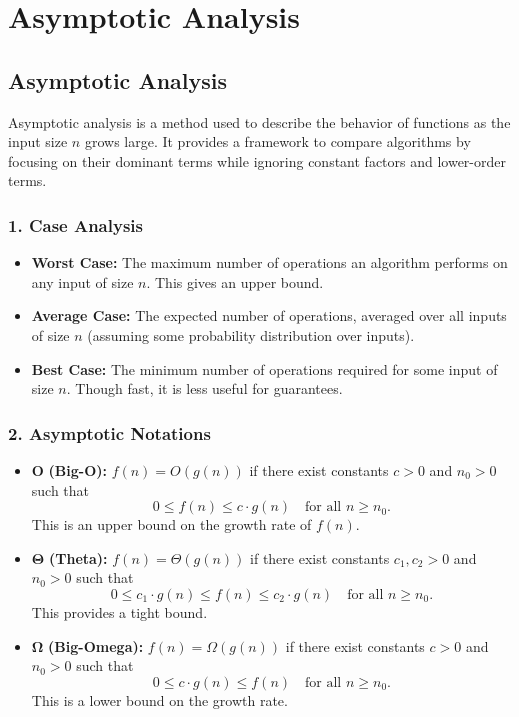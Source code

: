 \chapter{Asymptotic Analysis}

\section*{\Large \textbf{Asymptotic Analysis}}

Asymptotic analysis is a method used to describe the behavior of functions as the input size \(n\) grows large. It provides a framework to compare algorithms by focusing on their dominant terms while ignoring constant factors and lower-order terms.

\subsection*{\large \textbf{1. Case Analysis}}

\begin{itemize}[leftmargin=2em]
  \item \textbf{Worst Case:} The maximum number of operations an algorithm performs on any input of size \(n\). This gives an upper bound.
  \item \textbf{Average Case:} The expected number of operations, averaged over all inputs of size \(n\) (assuming some probability distribution over inputs).
  \item \textbf{Best Case:} The minimum number of operations required for some input of size \(n\). Though fast, it is less useful for guarantees.
\end{itemize}

\subsection*{\large \textbf{2. Asymptotic Notations}}

\begin{itemize}[leftmargin=2em]
  \item \(\mathbf{O}\) \textbf{(Big-O):}  
  \(f(n) = O(g(n))\) if there exist constants \(c > 0\) and \(n_0 > 0\) such that  
  \[
    0 \le f(n) \le c \cdot g(n) \quad \text{for all } n \ge n_0.
  \]
  This is an upper bound on the growth rate of \(f(n)\).

  \item \(\mathbf{\Theta}\) \textbf{(Theta):}  
  \(f(n) = \Theta(g(n))\) if there exist constants \(c_1, c_2 > 0\) and \(n_0 > 0\) such that  
  \[
    0 \le c_1 \cdot g(n) \le f(n) \le c_2 \cdot g(n) \quad \text{for all } n \ge n_0.
  \]
  This provides a tight bound.

  \item \(\mathbf{\Omega}\) \textbf{(Big-Omega):}  
  \(f(n) = \Omega(g(n))\) if there exist constants \(c > 0\) and \(n_0 > 0\) such that  
  \[
    0 \le c \cdot g(n) \le f(n) \quad \text{for all } n \ge n_0.
  \]
  This is a lower bound on the growth rate.
\end{itemize}

